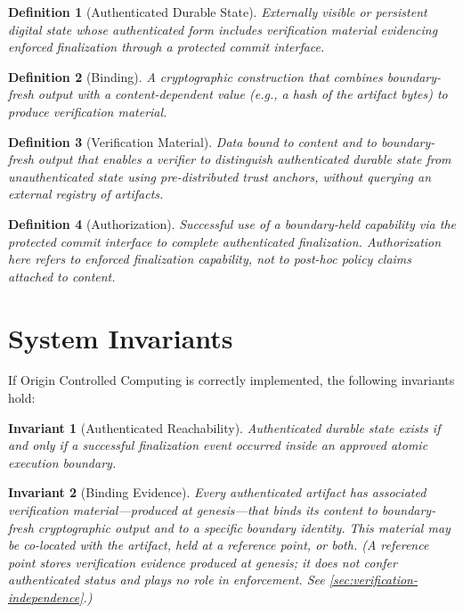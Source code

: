 \documentclass[11pt,letterpaper]{article}
\theoremstyle{occplain}
\newtheorem{definition}{Definition}[section]
\theoremstyle{occremark}
\newtheorem{invariant}{Invariant}[section]
\begin{document}
\begin{definition}[Authenticated Durable State]
\label{def:ads}
Externally visible or persistent digital state whose authenticated form includes verification material evidencing enforced finalization through a protected commit interface.
\end{definition}

\begin{definition}[Binding]
\label{def:binding}
A cryptographic construction that combines boundary-fresh output with a content-dependent value (e.g., a hash of the artifact bytes) to produce verification material.
\end{definition}

\begin{definition}[Verification Material]
\label{def:vm}
Data bound to content and to boundary-fresh output that enables a verifier to distinguish authenticated durable state from unauthenticated state using pre-distributed trust anchors, without querying an external registry of artifacts.
\end{definition}

\begin{definition}[Authorization]
\label{def:authorization}
Successful use of a boundary-held capability via the protected commit interface to complete authenticated finalization. Authorization here refers to enforced finalization capability, not to post-hoc policy claims attached to content.
\end{definition}


\section{System Invariants}
\label{sec:invariants}

If Origin Controlled Computing is correctly implemented, the following invariants hold:

\begin{invariant}[Authenticated Reachability]
\label{inv:reachability}
Authenticated durable state exists if and only if a successful finalization event occurred inside an approved atomic execution boundary.
\end{invariant}

\begin{invariant}[Binding Evidence]
\label{inv:binding}
Every authenticated artifact has associated verification material---produced at genesis---that binds its content to boundary-fresh cryptographic output and to a specific boundary identity. This material may be co-located with the artifact, held at a reference point, or both. (A reference point stores verification evidence produced at genesis; it does not confer authenticated status and plays no role in enforcement. See \cref{sec:verification-independence}.)
\end{invariant}
\end{document}
